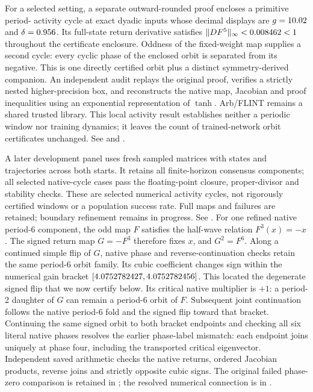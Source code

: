 \documentclass[11pt,letterpaper]{article}
\begin{document}
For a selected setting, a separate outward-rounded proof encloses a primitive
period-\nClarkRNNPeriod{} activity cycle at exact dyadic inputs whose decimal
displays are $g=10.02$ and $\delta=0.956$.
Its full-state return derivative satisfies
$\|DF^5\|_\infty<0.008462<1$ throughout the certificate enclosure.
Oddness of the fixed-weight map supplies a second cycle: every cyclic phase
of the enclosed orbit is separated from its negative. This is one directly
certified orbit plus a distinct symmetry-derived companion. An independent
audit replays the original proof, verifies a strictly nested higher-precision
box, and reconstructs the native map, Jacobian and proof inequalities using
an exponential representation of $\tanh$. Arb/FLINT remains a shared trusted
library. This local activity result establishes neither a periodic window nor
training dynamics; it leaves the count of trained-network orbit certificates
unchanged. See  and
.

A later development panel uses \nClarkPanelMatrices{} fresh sampled matrices
with \nClarkPanelDimension{} states and \nClarkPanelTrajectories{} trajectories
across both starts. It retains all \nClarkPanelComponents{} finite-horizon
consensus components; all \nClarkPanelQualified{} selected native-cycle cases
pass the floating-point closure, proper-divisor and stability checks.
These are selected numerical activity cycles, not rigorously certified
windows or a population success rate. Full maps and failures are retained;
boundary refinement remains in progress. See
.
For one refined native period-6 component, the odd map $F$ satisfies the
half-wave relation $F^3(x)=-x$. The signed return map $G=-F^3$ therefore fixes
$x$, and $G^2=F^6$. Along a continued simple flip of $G$, native phase and
reverse-continuation checks retain the same period-6 orbit family. Its cubic
coefficient changes sign within the numerical gain bracket
$[4.0752782427, 4.0752782456]$. This located the degenerate signed flip that we now
certify below. Its critical native multiplier is $+1$: a period-2 daughter
of $G$ can remain a period-6 orbit of $F$.
Subsequent joint continuation follows the native period-6 fold and the signed flip toward that
bracket. Continuing the same signed orbit to both bracket endpoints and checking all six literal
native phases resolves the earlier phase-label mismatch: each endpoint joins uniquely at phase four,
including the transported critical eigenvector. Independent saved arithmetic checks the native
returns, ordered Jacobian products, reverse joins and strictly opposite cubic signs. The original
failed phase-zero comparison is retained in ;
the resolved numerical connection is in .
\end{document}
